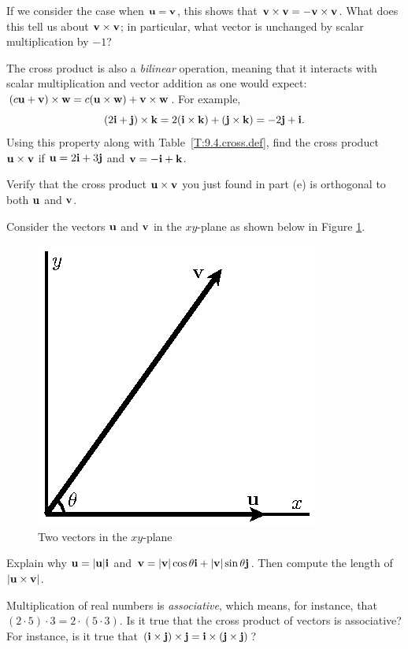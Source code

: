 \begin{pa}
    If we consider the case when $\mathbf{u}=\mathbf{v}$, this shows that
    $\mathbf{v}\times\mathbf{v} = -\mathbf{v}\times\mathbf{v}$.  What does this tell us about
    $\mathbf{v}\times\mathbf{v}$;  in particular, what vector is unchanged by
    scalar multiplication by $-1$?

  \item The cross product is also a {\em bilinear} operation, meaning
    that it interacts with scalar multiplication and vector addition
    as one would expect:  
    $(c\mathbf{u} + \mathbf{v})\times\mathbf{w} = c(\mathbf{u}\times\mathbf{w}) + \mathbf{v}\times\mathbf{w}$. For example, 
\[(2\mathbf{i} + \mathbf{j}) \times \mathbf{k} = 2(\mathbf{i} \times \mathbf{k}) + (\mathbf{j} \times \mathbf{k}) = -2\mathbf{j} + \mathbf{i}.\]
Using this property along with Table~\ref{T:9.4.cross.def}, find the cross product $\mathbf{u}\times\mathbf{v}$ if
    $\mathbf{u} = 2\mathbf{i} + 3\mathbf{j}$ and $\mathbf{v} = -\mathbf{i} + \mathbf{k}$.

  \item Verify that the cross product $\mathbf{u}\times\mathbf{v}$ you just found in
    part (e) is
    orthogonal to both $\mathbf{u}$ and $\mathbf{v}$.

  \item Consider the vectors $\mathbf{u}$ and $\mathbf{v}$ in the $xy$-plane as
    shown below in Figure \ref{F:9.4.activity_1}.

    \begin{figure}[ht]
      \begin{center}
        \includegraphics{figures/fig_9_4_activity_1.eps}
        \caption{Two vectors in the $xy$-plane}
        \label{F:9.4.activity_1}
      \end{center}
    \end{figure}

    Explain why $\mathbf{u} = |\mathbf{u}|\mathbf{i}$ and $\mathbf{v} = |\mathbf{v}|\cos\theta \mathbf{i} +
    |\mathbf{v}|\sin\theta \mathbf{j}$.  Then compute the length of $|\mathbf{u}\times\mathbf{v}|$.

  \item Multiplication of real numbers is {\em associative}, which
    means, for instance, that $(2\cdot 5)\cdot 3 = 2\cdot(5\cdot 3)$.
    Is it true that the cross product of vectors is associative?  For
    instance, is it true that
    $(\mathbf{i}\times\mathbf{j})\times\mathbf{j} = \mathbf{i}\times(\mathbf{j}\times\mathbf{j})$?

    \ea




\end{pa} 

